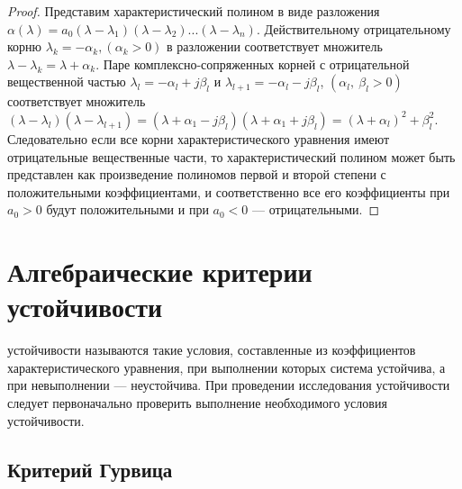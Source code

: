 \documentclass[../../TAU.tex]{subfiles}
\begin{document}
    \begin{proof}
        Представим характеристический полином в виде разложения
        $\alpha(\lambda)=a_0(\lambda-\lambda_1) (\lambda-\lambda_2) ... (\lambda-\lambda_n)$.
        Действительному отрицательному корню
        $\lambda_k = -\alpha_k, (\alpha_k>0)$
        в разложении соответствует множитель
        $\lambda - \lambda_k=\lambda+\alpha_k$.
        Паре комплексно-сопряженных корней с отрицательной вещественной частью 
        $\lambda_l=-\alpha_l+j \beta_l$ 
        и 
        $\lambda_{l+1}=-\alpha_l-j \beta_l$, 
        $(\alpha_l,\ \beta_l > 0)$ 
        соответствует множитель 
        $(\lambda-\lambda_l) (\lambda-\lambda_{l+1}) = (\lambda+\alpha_1 - j \beta_l) (\lambda+\alpha_1 + j \beta_l) = (\lambda+\alpha_l)^2+\beta_l^2$.
        Следовательно если все корни характеристического уравнения имеют отрицательные вещественные части, то характеристический полином может быть представлен как произведение полиномов первой и второй степени с положительными коэффициентами, и соответственно все его коэффициенты при 
        $a_0>0$ будут положительными и при 
        $a_0<0$ --- отрицательными.
    \end{proof}

\section{Алгебраические критерии устойчивости}

     устойчивости называются такие  условия, составленные из коэффициентов характеристического уравнения, при выполнении которых система устойчива, а при невыполнении --- неустойчива. При проведении исследования устойчивости следует первоначально проверить выполнение необходимого условия устойчивости.

\subsection{Критерий Гурвица}
\end{document}
